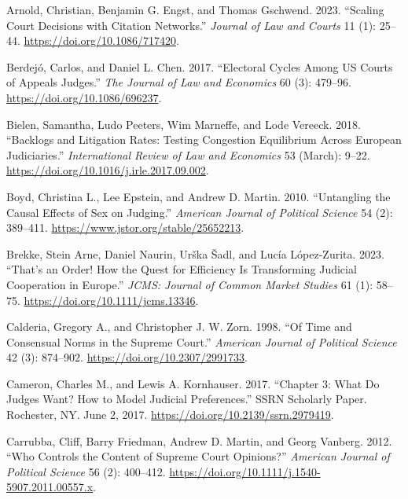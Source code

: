 \documentclass[
  11pt,
]{article}
\newlength{\cslhangindent}
\newenvironment{CSLReferences}[2] %
 {%
  \setlength{\parindent}{0pt}
  \ifodd #1 \everypar{\setlength{\hangindent}{\cslhangindent}}\ignorespaces\fi
  \ifnum #2 > 0
  \setlength{\parskip}{#2\baselineskip}
  \fi
 }%
 {}
\begin{document}
\hypertarget{refs}{}
\begin{CSLReferences}{1}{0}
\leavevmode{}%
Arnold, Christian, Benjamin G. Engst, and Thomas Gschwend. 2023.
{``Scaling {Court Decisions} with {Citation Networks}.''} \emph{Journal
of Law and Courts} 11 (1): 25--44. \url{https://doi.org/10.1086/717420}.

\leavevmode{}%
Berdejó, Carlos, and Daniel L. Chen. 2017. {``Electoral {Cycles} Among
{US Courts} of {Appeals Judges}.''} \emph{The Journal of Law and
Economics} 60 (3): 479--96. \url{https://doi.org/10.1086/696237}.

\leavevmode{}%
Bielen, Samantha, Ludo Peeters, Wim Marneffe, and Lode Vereeck. 2018.
{``Backlogs and Litigation Rates: {Testing} Congestion Equilibrium
Across {European} Judiciaries.''} \emph{International Review of Law and
Economics} 53 (March): 9--22.
\url{https://doi.org/10.1016/j.irle.2017.09.002}.

\leavevmode{}%
Boyd, Christina L., Lee Epstein, and Andrew D. Martin. 2010.
{``Untangling the {Causal Effects} of {Sex} on {Judging}.''}
\emph{American Journal of Political Science} 54 (2): 389--411.
\url{https://www.jstor.org/stable/25652213}.

\leavevmode{}%
Brekke, Stein Arne, Daniel Naurin, Urška Šadl, and Lucía López-Zurita.
2023. {``That's an {Order}! {How} the {Quest} for {Efficiency Is
Transforming Judicial Cooperation} in {Europe}.''} \emph{JCMS: Journal
of Common Market Studies} 61 (1): 58--75.
\url{https://doi.org/10.1111/jcms.13346}.

\leavevmode{}%
Calderia, Gregory A., and Christopher J. W. Zorn. 1998. {``Of {Time} and
{Consensual Norms} in the {Supreme Court}.''} \emph{American Journal of
Political Science} 42 (3): 874--902.
\url{https://doi.org/10.2307/2991733}.

\leavevmode{}%
Cameron, Charles M., and Lewis A. Kornhauser. 2017. {``Chapter 3: {What
Do Judges Want}? {How} to {Model Judicial Preferences}.''} SSRN
Scholarly Paper. {Rochester, NY}. June 2, 2017.
\url{https://doi.org/10.2139/ssrn.2979419}.

\leavevmode{}%
Carrubba, Cliff, Barry Friedman, Andrew D. Martin, and Georg Vanberg.
2012. {``Who {Controls} the {Content} of {Supreme Court Opinions}?''}
\emph{American Journal of Political Science} 56 (2): 400--412.
\url{https://doi.org/10.1111/j.1540-5907.2011.00557.x}.


\end{CSLReferences}
\end{document}
